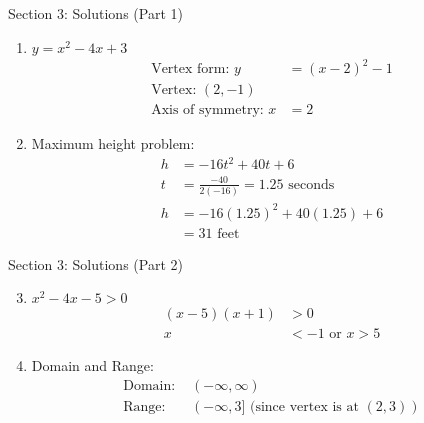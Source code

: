 \documentclass[aspectratio=169]{beamer}
\begin{document}
\begin{frame}{Section 3: Solutions (Part 1)}
    \begin{tcolorbox}[colback=lightgray,colframe=accent,title=Detailed Solutions]
        \footnotesize
        \begin{enumerate}
            \item $y = x^2 - 4x + 3$
            \begin{align*}
                \text{Vertex form: } y &= (x - 2)^2 - 1 \\
                \text{Vertex: } (2, -1) \\
                \text{Axis of symmetry: } x &= 2
            \end{align*}
            
            \item Maximum height problem:
            \begin{align*}
                h &= -16t^2 + 40t + 6 \\
                t &= \frac{-40}{2(-16)} = 1.25 \text{ seconds} \\
                h &= -16(1.25)^2 + 40(1.25) + 6 \\
                &= 31 \text{ feet}
            \end{align*}
        \end{enumerate}
    \end{tcolorbox}
\end{frame}

\begin{frame}{Section 3: Solutions (Part 2)}
    \begin{tcolorbox}[colback=lightgray,colframe=accent,title=Detailed Solutions (Continued)]
        \footnotesize
        \begin{enumerate}
            \setcounter{enumi}{2}
            \item $x^2 - 4x - 5 > 0$
            \begin{align*}
                (x - 5)(x + 1) &> 0 \\
                x &< -1 \text{ or } x > 5
            \end{align*}
            
            \item Domain and Range:
            \begin{align*}
                \text{Domain: } &(-\infty, \infty) \\
                \text{Range: } &(-\infty, 3] \text{ (since vertex is at } (2,3))
            \end{align*}
        \end{enumerate}
    \end{tcolorbox}
\end{frame}
\end{document}
